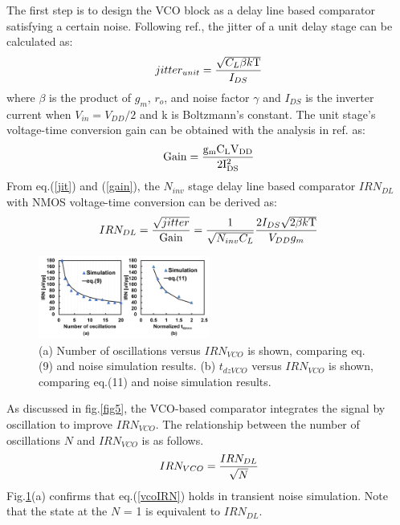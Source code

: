 \documentclass[journal]{IEEEtran}
\begin{document}
The first step is to design the VCO block as a delay line based comparator satisfying a certain noise.
Following ref.\cite{timecomp}, the jitter of a unit delay stage can be calculated as:
\begin{eqnarray}
    \centering
    jitter_{unit} = \frac{\sqrt{C_L\beta k \rm{T}}}{I_{DS}}
    \label{jit}
\end{eqnarray}
where $\beta$ is the product of $g_m$, $r_o$, and noise factor $\gamma$ and $I_{DS}$ is the inverter current when $V_{in} = V_{DD}/2$ and k is Boltzmann’s constant.
The unit stage's voltage-time conversion gain can be obtained with the analysis in ref.\cite{timecomp} as: 
\begin{eqnarray}
    \centering
    \rm{Gain} = \frac{g_mC_LV_{DD}}{2I_{DS}^2}
    \label{gain}
\end{eqnarray}
From eq.(\ref{jit}) and (\ref{gain}), the $N_{inv}$ stage delay line based comparator $IRN_{DL}$ with NMOS voltage-time conversion can be derived as:
\begin{eqnarray}
    \centering
    IRN_{DL} = \frac{\sqrt{jitter}}{\rm{Gain}} = \frac{1}{\sqrt{N_{inv}C_L}}\frac{2I_{DS}\sqrt{2\beta k\rm{T}}}{V_{DD}g_m}
    \label{delaylineIRN}
\end{eqnarray}

\begin{figure}[!]
\centering
 \includegraphics[width=0.5\textwidth]{figs/analysis.png}
  \caption{(a) Number of oscillations versus $IRN_{VCO}$ is shown, comparing eq.(9) and noise simulation results. (b) $t_{dzVCO}$ versus $IRN_{VCO}$ is shown, comparing eq.(11) and noise simulation results.}
  \label{nocnoise}
\end{figure}

As discussed in fig.\ref{fig5}, the VCO-based comparator integrates the signal by oscillation to improve $IRN_{VCO}$.
The relationship between the number of oscillations $N$ and $IRN_{VCO}$ is as follows.
\begin{eqnarray}
    \centering
    IRN_{VCO} = \frac{IRN_{DL}}{\sqrt{N}}
    \label{vcoIRN}
\end{eqnarray}
Fig.\ref{nocnoise}(a) confirms that eq.(\ref{vcoIRN}) holds in transient noise simulation. Note that the state at the $N$ = 1 is equivalent to $IRN_{DL}$.
\end{document}
